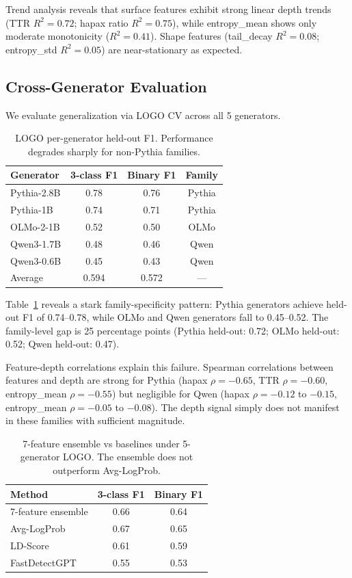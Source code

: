 \documentclass[11pt,a4paper]{article}
\begin{document}
Trend analysis reveals that surface features exhibit strong linear depth trends (TTR $R^2 = 0.72$; hapax ratio $R^2 = 0.75$), while entropy\_mean shows only moderate monotonicity ($R^2 = 0.41$).
Shape features (tail\_decay $R^2 = 0.08$; entropy\_std $R^2 = 0.05$) are near-stationary as expected.

\subsection{Cross-Generator Evaluation}
\label{sec:cross-gen}

We evaluate generalization via LOGO CV across all 5 generators.

\begin{table}[h]
\centering
\caption{LOGO per-generator held-out F1. Performance degrades sharply for non-Pythia families.}
\label{tab:logo}
\begin{tabular}{lccc}
\toprule
Generator & 3-class F1 & Binary F1 & Family \\
\midrule
Pythia-2.8B & 0.78 & 0.76 & Pythia \\
Pythia-1B & 0.74 & 0.71 & Pythia \\
OLMo-2-1B & 0.52 & 0.50 & OLMo \\
Qwen3-1.7B & 0.48 & 0.46 & Qwen \\
Qwen3-0.6B & 0.45 & 0.43 & Qwen \\
\midrule
Average & 0.594 & 0.572 & --- \\
\bottomrule
\end{tabular}
\end{table}

Table~\ref{tab:logo} reveals a stark family-specificity pattern: Pythia generators achieve held-out F1 of 0.74--0.78, while OLMo and Qwen generators fall to 0.45--0.52.
The family-level gap is 25 percentage points (Pythia held-out: 0.72; OLMo held-out: 0.52; Qwen held-out: 0.47).

Feature-depth correlations explain this failure.
Spearman correlations between features and depth are strong for Pythia (hapax $\rho = -0.65$, TTR $\rho = -0.60$, entropy\_mean $\rho = -0.55$) but negligible for Qwen (hapax $\rho = -0.12$ to $-0.15$, entropy\_mean $\rho = -0.05$ to $-0.08$).
The depth signal simply does not manifest in these families with sufficient magnitude.

\begin{table}[h]
\centering
\caption{7-feature ensemble vs baselines under 5-generator LOGO. The ensemble does not outperform Avg-LogProb.}
\label{tab:baselines}
\begin{tabular}{lcc}
\toprule
Method & 3-class F1 & Binary F1 \\
\midrule
7-feature ensemble & 0.66 & 0.64 \\
Avg-LogProb & 0.67 & 0.65 \\
LD-Score & 0.61 & 0.59 \\
FastDetectGPT & 0.55 & 0.53 \\
\bottomrule
\end{tabular}
\end{table}
\end{document}
